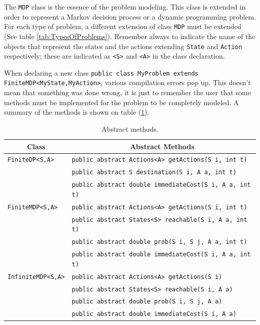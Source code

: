 \documentclass[11pt]{article}
\begin{document}
The \lstinline!MDP! class is the essence of the problem modeling. This class is extended in order to represent a Markov decision process or a dynamic programming problem. For each type of problem, a different extension of class \lstinline!MDP! must be extended (See table \ref{tab:TypesOfProblems}). Remember always to indicate the name of the objects that represent the states and the actions extending \lstinline!State! and \lstinline!Action! respectively; these are indicated as \lstinline!<S>! and \lstinline!<A>! in the class declaration.

When declaring a new class \lstinline!public class MyProblem extends FiniteMDP<MyState,MyAction>!, various compilation errors pop up. This doesn't mean that something was done wrong, it is just to remember the user that some methods must be implemented for the problem to be completely modeled. A summary of the methods is shown on table (\ref{tab:AbstractMethods}).

\begin{table}[ht]
  \centering
    \begin{tabular}{|l|l|}
      \hline
      \multicolumn{1}{|c|}{Class} & \multicolumn{1}{|c|}{Abstract Methods}\\
      \hline
      \lstinline!FiniteDP<S,A>! & \lstinline!public abstract Actions<A> getActions(S i, int t)! \\
      &\lstinline!public abstract S destination(S i, A a, int t)!\\

      &\lstinline!public abstract double immediateCost(S i, A a, int t)!\\
      \hline
      \lstinline!FiniteMDP<S,A>! & \lstinline!public abstract Actions<A> getActions(S i, int t)! \\
      &\lstinline!public abstract States<S> reachable(S i, A a, int t)!\\
      &\lstinline!public abstract double prob(S i, S j, A a, int t)!\\
      &\lstinline!public abstract double immediateCost(S i, A a, int t)!\\
      \hline
      \lstinline!InfiniteMDP<S,A>! & \lstinline!public abstract Actions<A> getActions(S i)! \\
      &\lstinline!public abstract States<S> reachable(S i, A a)!\\
      &\lstinline!public abstract double prob(S i, S j, A a)!\\
      &\lstinline!public abstract double immediateCost(S i, A a)!\\
      \hline
    \end{tabular}
  \caption{Abstract methods.}
  \label{tab:AbstractMethods}
\end{table}
\end{document}
